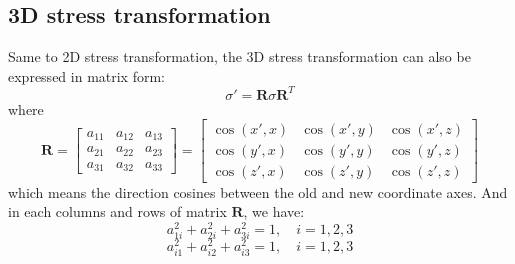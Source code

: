 \documentclass[en,hazy,cyan,8pt,normal]{elegantnote}
\begin{document}
  \subsection{3D stress transformation}
    Same to 2D stress transformation, the 3D stress transformation can also be expressed in matrix form:
    \begin{equation}\label{eq:019}
      \sigma'=\mathbf{R}\sigma \mathbf{R}^T
    \end{equation}
    where
    \begin{equation}\label{eq:020}
      \mathbf{R} =
        \begin{bmatrix}
        a_{11} & a_{12} & a_{13} \\
        a_{21} & a_{22} & a_{23} \\
        a_{31} & a_{32} & a_{33}
        \end{bmatrix}
        =
        \begin{bmatrix}
        \cos(x', x) & \cos(x', y) & \cos(x', z) \\
        \cos(y', x) & \cos(y', y) & \cos(y', z) \\
        \cos(z', x) & \cos(z', y) & \cos(z', z)
        \end{bmatrix}
    \end{equation}
    which means the direction cosines between the old and new coordinate axes.
    And in each columns and rows of matrix $\mathbf{R}$, we have:
    \begin{equation}\label{eq:021}
      a_{1i}^2 + a_{2i}^2 + a_{3i}^2 = 1, \quad i=1,2,3
    \end{equation}
    \begin{equation}\label{eq:022}
      a_{i1}^2 + a_{i2}^2 + a_{i3}^2 = 1, \quad i=1,2,3
    \end{equation}
\end{document}
